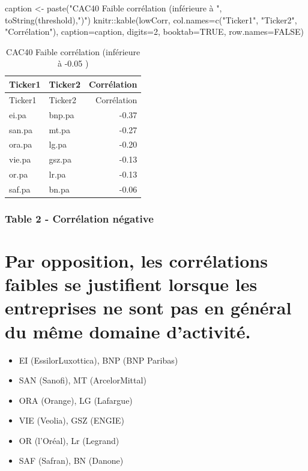\documentclass[
]{article}
\newenvironment{Shaded}{\begin{snugshade}}{\end{snugshade}}
\newcommand{\AttributeTok}[1]{\textcolor[rgb]{0.77,0.63,0.00}{#1}}
\newcommand{\ConstantTok}[1]{\textcolor[rgb]{0.00,0.00,0.00}{#1}}
\newcommand{\DecValTok}[1]{\textcolor[rgb]{0.00,0.00,0.81}{#1}}
\newcommand{\FunctionTok}[1]{\textcolor[rgb]{0.00,0.00,0.00}{#1}}
\newcommand{\NormalTok}[1]{#1}
\newcommand{\OtherTok}[1]{\textcolor[rgb]{0.56,0.35,0.01}{#1}}
\newcommand{\SpecialCharTok}[1]{\textcolor[rgb]{0.00,0.00,0.00}{#1}}
\newcommand{\StringTok}[1]{\textcolor[rgb]{0.31,0.60,0.02}{#1}}
\providecommand{\tightlist}{%
  \setlength{\itemsep}{0pt}\setlength{\parskip}{0pt}}
\begin{document}
\begin{Shaded}
\begin{Highlighting}[]
\NormalTok{caption }\OtherTok{\textless{}{-}} \FunctionTok{paste}\NormalTok{(}\StringTok{"CAC40 Faible corrélation (inférieure à  "}\NormalTok{, }\FunctionTok{toString}\NormalTok{(threshold),}\StringTok{")"}\NormalTok{)}
\NormalTok{knitr}\SpecialCharTok{::}\FunctionTok{kable}\NormalTok{(lowCorr,}
             \AttributeTok{col.names=}\FunctionTok{c}\NormalTok{(}\StringTok{"Ticker1"}\NormalTok{, }\StringTok{"Ticker2"}\NormalTok{, }\StringTok{"Corrélation"}\NormalTok{), }
             \AttributeTok{caption=}\NormalTok{caption,}
             \AttributeTok{digits=}\DecValTok{2}\NormalTok{, }\AttributeTok{booktab=}\ConstantTok{TRUE}\NormalTok{, }\AttributeTok{row.names=}\ConstantTok{FALSE}\NormalTok{)}
\end{Highlighting}
\end{Shaded}

\begin{longtable}[]{@{}llr@{}}
\caption{CAC40 Faible corrélation (inférieure à -0.05 )}\tabularnewline
\toprule
Ticker1 & Ticker2 & Corrélation\tabularnewline
\midrule
\endfirsthead
\toprule
Ticker1 & Ticker2 & Corrélation\tabularnewline
\midrule
\endhead
ei.pa & bnp.pa & -0.37\tabularnewline
san.pa & mt.pa & -0.27\tabularnewline
ora.pa & lg.pa & -0.20\tabularnewline
vie.pa & gsz.pa & -0.13\tabularnewline
or.pa & lr.pa & -0.13\tabularnewline
saf.pa & bn.pa & -0.06\tabularnewline
\bottomrule
\end{longtable}

\hypertarget{table-2---corruxe9lation-nuxe9gative}{%
\subsubsection{Table 2 - Corrélation
négative}\label{table-2---corruxe9lation-nuxe9gative}}

\hypertarget{par-opposition-les-corruxe9lations-faibles-se-justifient-lorsque-les-entreprises-ne-sont-pas-en-guxe9nuxe9ral-du-muxeame-domaine-dactivituxe9.}{%
\section{Par opposition, les corrélations faibles se justifient lorsque
les entreprises ne sont pas en général du même domaine
d'activité.}\label{par-opposition-les-corruxe9lations-faibles-se-justifient-lorsque-les-entreprises-ne-sont-pas-en-guxe9nuxe9ral-du-muxeame-domaine-dactivituxe9.}}

\begin{itemize}
\tightlist
\item
  EI (EssilorLuxottica), BNP (BNP Paribas)
\item
  SAN (Sanofi), MT (ArcelorMittal)
\item
  ORA (Orange), LG (Lafargue)
\item
  VIE (Veolia), GSZ (ENGIE)
\item
  OR (l'Oréal), Lr (Legrand)
\item
  SAF (Safran), BN (Danone)
\end{itemize}
\end{document}
